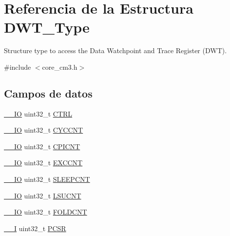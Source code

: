 \hypertarget{struct_d_w_t___type}{}\section{Referencia de la Estructura D\+W\+T\+\_\+\+Type}
\label{struct_d_w_t___type}


Structure type to access the Data Watchpoint and Trace Register (D\+WT).  




{\ttfamily \#include $<$core\+\_\+cm3.\+h$>$}

\subsection*{Campos de datos}
\begin{DoxyCompactItemize}
\item 
\hyperlink{core__sc300_8h_aec43007d9998a0a0e01faede4133d6be}{\+\_\+\+\_\+\+IO} uint32\+\_\+t \hyperlink{struct_d_w_t___type_a15fc8d35f045f329b80c544bef35ff64}{C\+T\+RL}
\item 
\hyperlink{core__sc300_8h_aec43007d9998a0a0e01faede4133d6be}{\+\_\+\+\_\+\+IO} uint32\+\_\+t \hyperlink{struct_d_w_t___type_acf6d1c3e5f5cef92986fd9cfae5c7224}{C\+Y\+C\+C\+NT}
\item 
\hyperlink{core__sc300_8h_aec43007d9998a0a0e01faede4133d6be}{\+\_\+\+\_\+\+IO} uint32\+\_\+t \hyperlink{struct_d_w_t___type_a49a1dced8d644fa6f4128570f102212e}{C\+P\+I\+C\+NT}
\item 
\hyperlink{core__sc300_8h_aec43007d9998a0a0e01faede4133d6be}{\+\_\+\+\_\+\+IO} uint32\+\_\+t \hyperlink{struct_d_w_t___type_ae6edad4ef9f92b3ce206dac61621871a}{E\+X\+C\+C\+NT}
\item 
\hyperlink{core__sc300_8h_aec43007d9998a0a0e01faede4133d6be}{\+\_\+\+\_\+\+IO} uint32\+\_\+t \hyperlink{struct_d_w_t___type_a720f3795a53a8d8f275df636fee1aee7}{S\+L\+E\+E\+P\+C\+NT}
\item 
\hyperlink{core__sc300_8h_aec43007d9998a0a0e01faede4133d6be}{\+\_\+\+\_\+\+IO} uint32\+\_\+t \hyperlink{struct_d_w_t___type_ab1d62b8e1a69bead9717d5a02f741811}{L\+S\+U\+C\+NT}
\item 
\hyperlink{core__sc300_8h_aec43007d9998a0a0e01faede4133d6be}{\+\_\+\+\_\+\+IO} uint32\+\_\+t \hyperlink{struct_d_w_t___type_a11e6aebbf2c7bedc29059ff023891b82}{F\+O\+L\+D\+C\+NT}
\item 
\hyperlink{core__sc300_8h_af63697ed9952cc71e1225efe205f6cd3}{\+\_\+\+\_\+I} uint32\+\_\+t \hyperlink{struct_d_w_t___type_accef6b622c8a41342ed32345b0922bea}{P\+C\+SR}

\end{DoxyCompactItemize}
